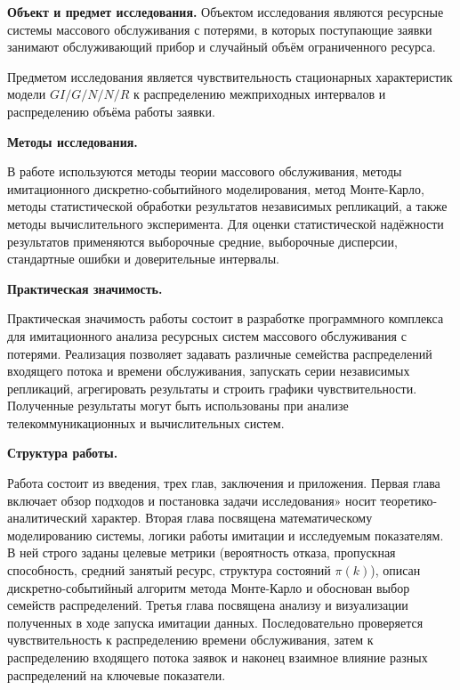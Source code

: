 \textbf{Объект и предмет исследования.} 
Объектом исследования являются ресурсные системы массового обслуживания с потерями, в которых поступающие заявки занимают обслуживающий прибор и случайный объём ограниченного ресурса. 

Предметом исследования является чувствительность стационарных характеристик модели $GI/G/N/N/R$ к распределению межприходных интервалов и распределению объёма работы заявки.

\textbf{Методы исследования.} 

В работе используются методы теории массового обслуживания, методы имитационного дискретно-событийного моделирования, метод Монте-Карло, методы статистической обработки результатов независимых репликаций, а также методы вычислительного эксперимента. Для оценки статистической надёжности результатов применяются выборочные средние, выборочные дисперсии, стандартные ошибки и доверительные интервалы. 

\textbf{Практическая значимость.} 

Практическая значимость работы состоит в разработке программного комплекса для имитационного анализа ресурсных систем массового обслуживания с потерями. Реализация позволяет задавать различные семейства распределений входящего потока и времени обслуживания, запускать серии независимых репликаций, агрегировать результаты и строить графики чувствительности. Полученные результаты могут быть использованы при анализе телекоммуникационных и вычислительных систем. 

\textbf{Структура работы.}

Работа состоит из введения, трех глав, заключения и приложения.
Первая глава включает обзор подходов и постановка задачи исследования» носит теоретико-аналитический характер. 
Вторая глава посвящена математическому моделированию системы, логики работы имитации и исследуемым показателям. В ней строго заданы целевые метрики (вероятность отказа, пропускная способность, средний занятый ресурс, структура состояний $\pi(k)$), описан дискретно-событийный алгоритм метода Монте-Карло и обоснован выбор семейств распределений. 
Третья глава посвящена анализу и визуализации полученных в ходе запуска имитации данных. Последовательно проверяется чувствительность к распределению времени обслуживания, затем к распределению входящего потока заявок и наконец взаимное влияние разных распределений на ключевые показатели. 

